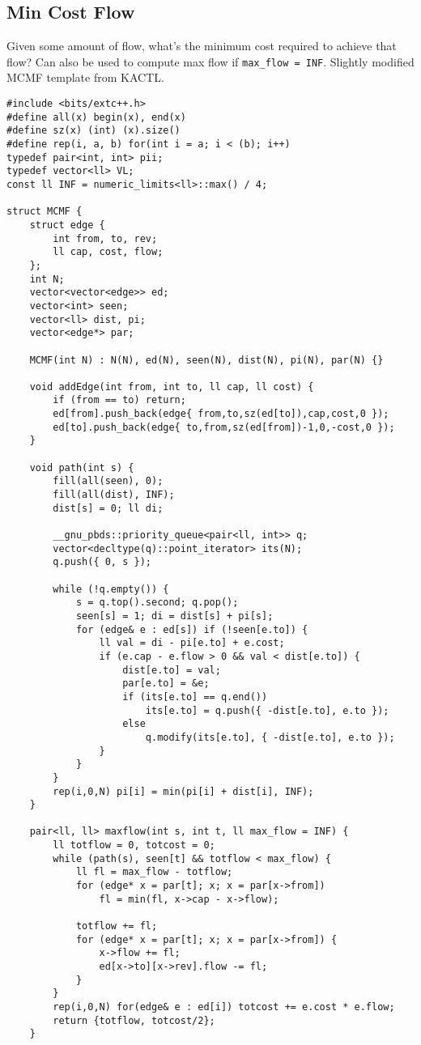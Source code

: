 \documentclass[8pt, headheight=10pt, a4paper]{article}
\begin{document}
\begin{multicols*}{3}
\subsection{Min Cost Flow}
Given some amount of flow, what's the minimum cost required to achieve that flow? Can also be used to compute max flow if \lstinline{max_flow = INF}. 
Slightly modified MCMF template from KACTL.
\begin{lstlisting}
#include <bits/extc++.h>
#define all(x) begin(x), end(x)
#define sz(x) (int) (x).size()
#define rep(i, a, b) for(int i = a; i < (b); i++)
typedef pair<int, int> pii;
typedef vector<ll> VL;
const ll INF = numeric_limits<ll>::max() / 4;

struct MCMF {
	struct edge {
		int from, to, rev;
		ll cap, cost, flow;
	};
	int N;
	vector<vector<edge>> ed;
	vector<int> seen;
	vector<ll> dist, pi;
	vector<edge*> par;

	MCMF(int N) : N(N), ed(N), seen(N), dist(N), pi(N), par(N) {}

	void addEdge(int from, int to, ll cap, ll cost) {
		if (from == to) return;
		ed[from].push_back(edge{ from,to,sz(ed[to]),cap,cost,0 });
		ed[to].push_back(edge{ to,from,sz(ed[from])-1,0,-cost,0 });
	}

	void path(int s) {
		fill(all(seen), 0);
		fill(all(dist), INF);
		dist[s] = 0; ll di;

		__gnu_pbds::priority_queue<pair<ll, int>> q;
		vector<decltype(q)::point_iterator> its(N);
		q.push({ 0, s });

		while (!q.empty()) {
			s = q.top().second; q.pop();
			seen[s] = 1; di = dist[s] + pi[s];
			for (edge& e : ed[s]) if (!seen[e.to]) {
				ll val = di - pi[e.to] + e.cost;
				if (e.cap - e.flow > 0 && val < dist[e.to]) {
					dist[e.to] = val;
					par[e.to] = &e;
					if (its[e.to] == q.end())
						its[e.to] = q.push({ -dist[e.to], e.to });
					else
						q.modify(its[e.to], { -dist[e.to], e.to });
				}
			}
		}
		rep(i,0,N) pi[i] = min(pi[i] + dist[i], INF);
	}
    
	pair<ll, ll> maxflow(int s, int t, ll max_flow = INF) {
		ll totflow = 0, totcost = 0;
		while (path(s), seen[t] && totflow < max_flow) {
			ll fl = max_flow - totflow;
			for (edge* x = par[t]; x; x = par[x->from])
				fl = min(fl, x->cap - x->flow);

			totflow += fl;
			for (edge* x = par[t]; x; x = par[x->from]) {
				x->flow += fl;
				ed[x->to][x->rev].flow -= fl;
			}
		}
		rep(i,0,N) for(edge& e : ed[i]) totcost += e.cost * e.flow;
		return {totflow, totcost/2};
	}


\end{lstlisting}
\end{multicols*}
\end{document}
